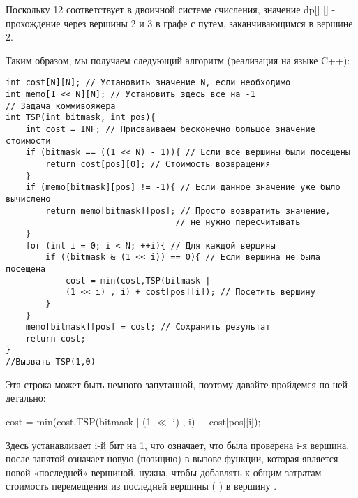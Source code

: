 \vspace{\baselineskip}
Поскольку 12 соответствует  в двоичной системе счисления, значение dp[] [] - прохождение через вершины 2 и 3 в графе с путем, заканчивающимся в вершине 2.

\vspace{\baselineskip}
Таким образом, мы получаем следующий алгоритм (реализация на языке C++):

\vspace{\baselineskip}
\begin{tcolorbox}
\begin{verbatim}
int cost[N][N]; // Установить значение N, если необходимо
int memo[1 << N][N]; // Установить здесь все на -1
// Задача коммивояжера
int TSP(int bitmask, int pos){    
	int cost = INF; // Присваиваем бесконечно большое значение стоимости    
	if (bitmask == ((1 << N) - 1)){ // Если все вершины были посещены        
		return cost[pos][0]; // Стоимость возвращения    
	}    
	if (memo[bitmask][pos] != -1){ // Если данное значение уже было вычислено        
		return memo[bitmask][pos]; // Просто возвратить значение, 
		                          // не нужно пересчитывать    
	}    
	for (int i = 0; i < N; ++i){ // Для каждой вершины        
		if ((bitmask & (1 << i)) == 0){ // Если вершина не была посещена            
			cost = min(cost,TSP(bitmask |
			(1 << i) , i) + cost[pos][i]); // Посетить вершину        
		}    
	}    
	memo[bitmask][pos] = cost; // Сохранить результат    
	return cost; 
} 
//Вызвать TSP(1,0)
\end{verbatim}
\end{tcolorbox}

\vspace{\baselineskip}
Эта строка может быть немного запутанной, поэтому давайте пройдемся по ней детально:

\vspace{\baselineskip}
\begin{tcolorbox}
cost = min(cost,TSP(bitmask | (1 $\ll$  i) , i) + cost[pos][i]);
\end{tcolorbox}

\vspace{\baselineskip}
Здесь  устанавливает i-й бит  на 1, что означает, что была проверена i-я вершина.  после запятой означает новую  (позицию) в вызове функции, которая является новой «последней» вершиной.  нужна, чтобы добавлять к общим затратам стоимость перемещения из последней вершины (  ) в вершину .

